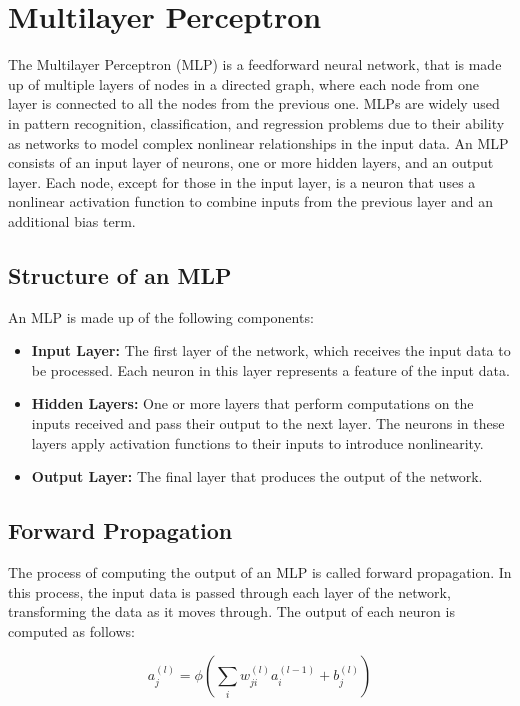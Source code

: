 \section{Multilayer Perceptron}

The Multilayer Perceptron (MLP) is a feedforward neural network, that is made up of multiple layers of nodes in a directed graph, where each node from one layer is connected to all the nodes from the previous one.
MLPs are widely used in pattern recognition, classification, and regression problems due to their ability as networks to model complex nonlinear relationships in the input data.
An MLP consists of an input layer of neurons, one or more hidden layers, and an output layer.
Each node, except for those in the input layer, is a neuron that uses a nonlinear activation function to combine inputs from the previous layer and an additional bias term.

\subsection{Structure of an MLP}

An MLP is made up of the following components:
\begin{itemize}
	\item \textbf{Input Layer:} The first layer of the network, which receives the input data to be processed. Each neuron in this layer represents a feature of the input data.
	\item \textbf{Hidden Layers:} One or more layers that perform computations on the inputs received and pass their output to the next layer. The neurons in these layers apply activation functions to their inputs to introduce nonlinearity.
	\item \textbf{Output Layer:} The final layer that produces the output of the network.
\end{itemize}

\subsection{Forward Propagation}

The process of computing the output of an MLP is called forward propagation.
In this process, the input data is passed through each layer of the network, transforming the data as it moves through. The output of each neuron is computed as follows:

\begin{equation}
	a^{(l)}_j = \phi\left(\sum_{i} w^{(l)}_{ji} a^{(l-1)}_i + b^{(l)}_j\right)
\end{equation}

